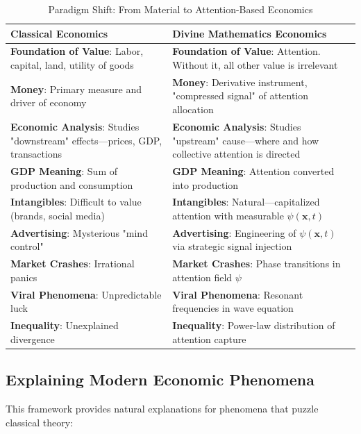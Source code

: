 \documentclass[11pt,a4paper]{article}
\theoremstyle{definition}
\theoremstyle{remark}
\begin{document}
\begin{small}
\begin{table}[H]
\centering
\caption{Paradigm Shift: From Material to Attention-Based Economics}
\label{tab:material_vs_attention}
\begin{tabular}{|p{5.5cm}|p{5.5cm}|}
\hline
\textbf{Classical Economics} & \textbf{Divine Mathematics Economics} \\
\hline
\rowcolor{blue!10}
\textbf{Foundation of Value}: Labor, capital, land, utility of goods & \textbf{Foundation of Value}: Attention. Without it, all other value is irrelevant \\
\hline
\textbf{Money}: Primary measure and driver of economy & \textbf{Money}: Derivative instrument, "compressed signal" of attention allocation \\
\hline
\textbf{Economic Analysis}: Studies "downstream" effects—prices, GDP, transactions & \textbf{Economic Analysis}: Studies "upstream" cause—where and how collective attention is directed \\
\hline
\textbf{GDP Meaning}: Sum of production and consumption & \textbf{GDP Meaning}: Attention converted into production \\
\hline
\textbf{Intangibles}: Difficult to value (brands, social media) & \textbf{Intangibles}: Natural—capitalized attention with measurable \(\psi(\mathbf{x},t)\) \\
\hline
\rowcolor{green!10}
\textbf{Advertising}: Mysterious "mind control" & \textbf{Advertising}: Engineering of \(\psi(\mathbf{x},t)\) via strategic signal injection \\
\hline
\textbf{Market Crashes}: Irrational panics & \textbf{Market Crashes}: Phase transitions in attention field \(\psi\) \\
\hline
\textbf{Viral Phenomena}: Unpredictable luck & \textbf{Viral Phenomena}: Resonant frequencies in wave equation \\
\hline
\textbf{Inequality}: Unexplained divergence & \textbf{Inequality}: Power-law distribution of attention capture \\
\hline
\end{tabular}
\end{table}

\subsection{Explaining Modern Economic Phenomena}

This framework provides natural explanations for phenomena that puzzle classical theory:


\end{small}
\end{document}
